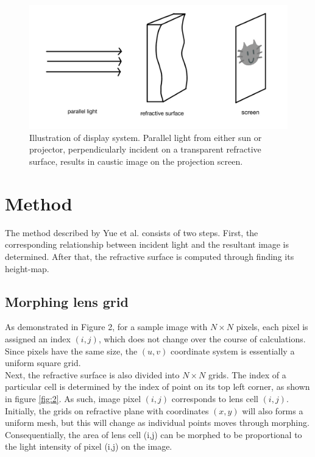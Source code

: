 \documentclass[10pt,two column]{configuration/unoesc}
\begin{document}
\begin{figure}[h!]
\centering
\includegraphics[width=1.0\linewidth]{figures/figure1.jpg} 
\caption{Illustration of display system. Parallel light from either sun or projector, perpendicularly incident on a transparent refractive surface, results in caustic image on the projection screen.}
\label{fig:1}
\end{figure}

\section{Method}
The method described by Yue et al.\cite{yue2014poisson} consists of two steps. First, the corresponding relationship between incident light and the resultant image is determined. After that, the refractive surface is computed through finding its height-map.\\

\subsection{Morphing lens grid}

As demonstrated in Figure 2, for a sample image with $N \times N$ pixels, each pixel is assigned an index $(i,j)$, which does not change over the course of calculations. Since pixels have the same size, the $(u,v)$ coordinate system is essentially a uniform square grid.\\

Next, the refractive surface is also divided into $N \times N$ grids. The index of a particular cell is determined by the index of point on its top left corner, as shown in figure \ref{fig:2}. As such, image pixel $(i,j)$ corresponds to lens cell $(i,j)$. Initially, the grids on refractive plane with coordinates $(x,y)$ will also forms a uniform mesh, but this will change as individual points moves through morphing. Consequentially, the area of lens cell (i,j) can be morphed to be proportional to the light intensity of pixel (i,j) on the image.\\
\end{document}
